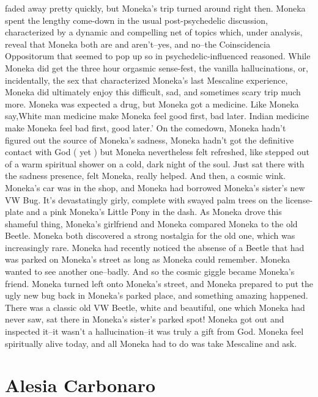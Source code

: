 \documentclass[12pt]{book}
\begin{document}
faded away pretty quickly, but Moneka's trip turned around right then. Moneka spent the lengthy come-down in the usual post-psychedelic discussion, characterized by a dynamic and compelling net of topics which, under analysis, reveal that Moneka both are and aren't--yes, and no--the Coinscidencia Oppositorum that seemed to pop up so in psychedelic-influenced reasoned. While Moneka did get the three hour orgasmic sense-fest, the vanilla hallucinations, or, incidentally, the sex that characterized Moneka's last Mescaline experience, Moneka did ultimately enjoy this difficult, sad, and sometimes scary trip much more. Moneka was expected a drug, but Moneka got a medicine. Like Moneka say,White man medicine make Moneka feel good first, bad later. Indian medicine make Moneka feel bad first, good later.' On the comedown, Moneka hadn't figured out the source of Moneka's sadness, Moneka hadn't got the definitive contact with God ( yet ) but Moneka nevertheless felt refreshed, like stepped out of a warm spiritual shower on a cold, dark night of the soul. Just sat there with the sadness presence, felt Moneka, really helped. And then, a cosmic wink. Moneka's car was in the shop, and Moneka had borrowed Moneka's sister's new VW Bug. It's devastatingly girly, complete with swayed palm trees on the license-plate and a pink Moneka's Little Pony in the dash. As Moneka drove this shameful thing, Moneka's girlfriend and Moneka compared Moneka to the old Beetle. Moneka both discovered a strong nostalgia for the old one, which was increasingly rare. Moneka had recently noticed the absense of a Beetle that had was parked on Moneka's street as long as Moneka could remember. Moneka wanted to see another one--badly. And so the cosmic giggle became Moneka's friend. Moneka turned left onto Moneka's street, and Moneka prepared to put the ugly new bug back in Moneka's parked place, and something amazing happened. There was a classic old VW Beetle, white and beautiful, one which Moneka had never saw, sat there in Moneka's sister's parked spot! Moneka got out and inspected it--it wasn't a hallucination--it was truly a gift from God. Moneka feel spiritually alive today, and all Moneka had to do was take Mescaline and ask.



\chapter{Alesia Carbonaro}
\end{document}
